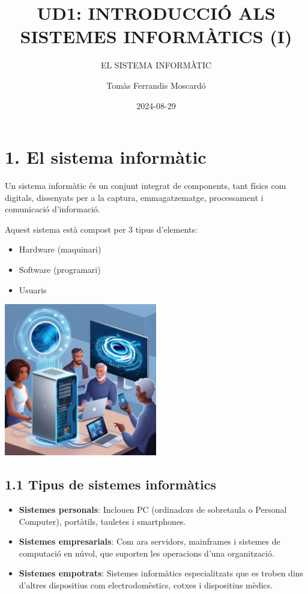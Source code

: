 \documentclass[
  12 pt,
  a4paper,
]{article}
\title{UD1: INTRODUCCIÓ ALS SISTEMES INFORMÀTICS (I)}
\subtitle{EL SISTEMA INFORMÀTIC}
\author{Tomàs Ferrandis Moscardó}
\date{2024-08-29}
\providecommand{\tightlist}{%
  \setlength{\itemsep}{0pt}\setlength{\parskip}{0pt}}
\begin{document}
\maketitle

{
\setcounter{tocdepth}{2}
\tableofcontents
}
\newpage
\renewcommand\tablename{Tabla}

\section{1. El sistema informàtic}\label{el-sistema-informuxe0tic}

Un sistema informàtic és un conjunt integrat de components, tant físics
com digitals, dissenyats per a la captura, emmagatzematge, processament
i comunicació d'informació.

Aquest sistema està compost per 3 tipus d'elements:

\begin{itemize}
\item
  Hardware (maquinari)
\item
  Software (programari)
\item
  Usuaris
\end{itemize}

\includegraphics[width=0.5\textwidth,height=\textheight]{png/treselementsFuturista.jpg}

\subsection{1.1 Tipus de sistemes
informàtics}\label{tipus-de-sistemes-informuxe0tics}

\begin{itemize}
\tightlist
\item
  \textbf{Sistemes personals}: Inclouen PC (ordinadors de sobretaula o
  Personal Computer), portàtils, tauletes i smartphones.
\item
  \textbf{Sistemes empresarials}: Com ara servidors, mainframes i
  sistemes de computació en núvol, que suporten les operacions d'una
  organització.
\item
  \textbf{Sistemes empotrats}: Sistemes informàtics especialitzats que
  es troben dins d'altres dispositius com electrodomèstics, cotxes i
  dispositius mèdics.
\end{itemize}
\end{document}
